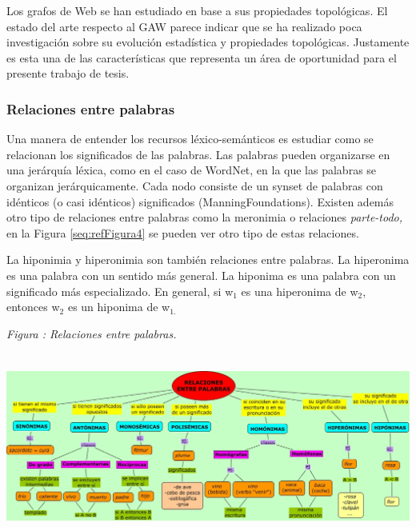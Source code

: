 \documentclass[letterpaper]{article}
\newcommand\textsubscript[1]{\ensuremath{{}_{\text{#1}}}}
\newcommand\textstylebibuscitbase[1]{#1}
\newcounter{Figura}
\renewcommand\theFigura{\arabic{Figura}}
\begin{document}
\bigskip

{\sffamily
Los grafos de Web se han estudiado en base a sus propiedades
topol\'ogicas. El estado del arte respecto al GAW parece indicar que se
ha realizado poca investigaci\'on sobre su evoluci\'on estad\'istica y
propiedades topol\'ogicas. Justamente es esta una de las
caracter\'isticas que representa un \'area de oportunidad para el
presente trabajo de tesis.}

%


\subsubsection[Relaciones entre palabras]{Relaciones entre palabras}
\hypertarget{RefHeading334457232820}{}
\bigskip

{\sffamily
Una manera de entender los recursos l\'exico-sem\'anticos es estudiar
como se relacionan los significados de las palabras. Las palabras
pueden organizarse en una jer\'arqu\'ia l\'exica, como en el caso de
WordNet, en la que las palabras se organizan jer\'arquicamente. Cada
nodo consiste de un synset de palabras con id\'enticos (o casi
id\'enticos) significados \textstylebibuscitbase{(ManningFoundations)}.
Existen adem\'as otro tipo de relaciones entre palabras como la
meronimia o relaciones \textit{parte-todo, }en la Figura
\ref{seq:refFigura4} se pueden ver otro tipo de estas relaciones.}


\bigskip

{\sffamily
La hiponimia y hiperonimia%
 son tambi\'en relaciones entre palabras. La hiperonima es una palabra
con un sentido m\'as general. La hiponima es una palabra con un
significado m\'as especializado. En general, si w\textsubscript{1} es
una hiperonima de w\textsubscript{2}, entonces
w\foreignlanguage{spanish}{\textsubscript{2}} es un hiponima de
w\foreignlanguage{spanish}{\textsubscript{1.}}}


\bigskip



\begin{center}
\begin{minipage}{15.221cm}
{\centering{}\itshape
Figura {\theFigura\label{seq:refFigura4}}:
Relaciones entre palabras.
\par}
\includegraphics[width=16.591cm,height=6.149cm]{Capitulo2-img11.jpg}\end{minipage}
\end{center}
\end{document}
